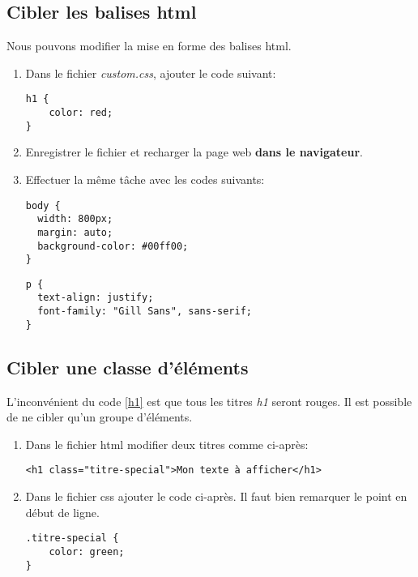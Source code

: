 \documentclass[a4paper,11pt]{article}
\begin{document}
\begin{Form}
\subsection{Cibler les balises html}
Nous pouvons modifier la mise en forme des balises html.
\begin{activite}
\begin{enumerate}
\item Dans le fichier \emph{custom.css}, ajouter le code suivant:
\begin{center}
\begin{lstlisting}
h1 {
	color: red;
}
\end{lstlisting}
\label{h1}
\end{center}
\item Enregistrer le fichier et recharger la page web \textbf{dans le navigateur}.
\item Effectuer la même tâche avec les codes suivants:
\begin{lstlisting}
body {
  width: 800px;
  margin: auto;
  background-color: #00ff00;
}
\end{lstlisting}
\begin{lstlisting}
p {
  text-align: justify;
  font-family: "Gill Sans", sans-serif;
}
\end{lstlisting}
\end{enumerate}
\end{activite}
\subsection{Cibler une classe d'éléments}
L'inconvénient du code \ref{h1} est que tous les titres \emph{h1} seront rouges. Il est possible de ne cibler qu'un groupe d'éléments.
\begin{activite}
\begin{enumerate}
\item Dans le fichier html modifier deux titres comme ci-après:
\begin{lstlisting}
<h1 class="titre-special">Mon texte à afficher</h1>
\end{lstlisting}
\medskip
\item Dans le fichier css ajouter le code ci-après. Il faut bien remarquer le point en début de ligne.
\begin{lstlisting}
.titre-special {
	color: green;
}
\end{lstlisting}
\medskip
\end{enumerate}
\end{activite}

\end{Form}
\end{document}
